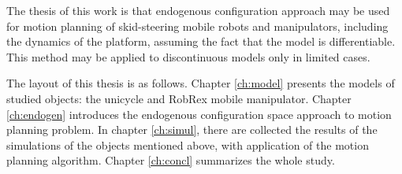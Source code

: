 The thesis of this work is that endogenous configuration approach may be used for
motion planning of skid-steering mobile robots and manipulators, including the dynamics of the platform, assuming the fact that the model is differentiable. This method may be applied to discontinuous models only in limited cases.

The layout of this thesis is as follows. Chapter \ref{ch:model} presents the models of studied
objects: the unicycle and RobRex mobile manipulator. Chapter \ref{ch:endogen} introduces the endogenous
configuration space approach to motion planning problem. In chapter \ref{ch:simul}, there are collected
the results of the simulations of the objects mentioned above, with application of the motion
planning algorithm. Chapter \ref{ch:concl} summarizes the whole study.
